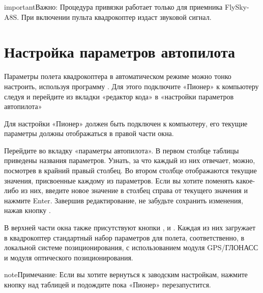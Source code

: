 \documentclass[a4paper,10pt,russian]{sphinxmanual}
\begin{document}
\begin{sphinxadmonition}{important}{Важно:}
Процедура привязки работает только для приемника FlySky-A8S. При включении пульта квадрокоптер издаст звуковой сигнал.
\end{sphinxadmonition}


\section{Настройка параметров автопилота}
\label{\detokenize{settings/autopilot_parameters:id1}}\label{\detokenize{settings/autopilot_parameters::doc}}
Параметры полета квадрокоптера в автоматическом режиме можно тонко настроить, используя программу {\hyperref[\detokenize{programming/pioneer_station/pioneer_station_main::doc}]{}}. Для этого подключите «Пионер» к компьютеру следуя  и перейдите из вкладки «редактор кода» в «настройки параметров автопилота»

Для настройки «Пионер» должен быть подключен к компьютеру, его текущие параметры должны отображаться в правой части окна.


Перейдите во вкладку «параметры автопилота». В первом столбце таблицы приведены названия параметров. Узнать, за что каждый из них отвечает, можно, посмотрев в крайний правый столбец. Во втором столбце отображаются текущие значения, присвоенные каждому из параметров. Если вы хотите поменять какое-либо из них, введите новое значение в столбец справа от текущего значения и нажмите Enter.
Завершив редактирование, не забудьте сохранить изменения, нажав кнопку .

В верхней части окна также присутствуют кнопки ,  и . Каждая из них загружает в квадрокоптер стандартный набор параметров для полета, соответственно, в локальной системе позиционирования, с использованием модуля GPS/ГЛОНАСС и модуля оптического позиционирования.

\begin{sphinxadmonition}{note}{Примечание:}
Если вы хотите вернуться к заводским настройкам, нажмите кнопку  над таблицей и подождите пока «Пионер» перезапустится.
\end{sphinxadmonition}
\end{document}
